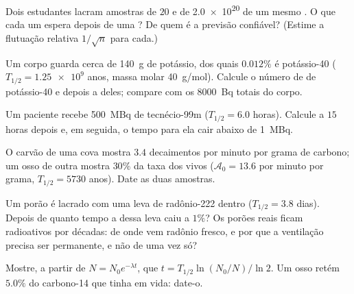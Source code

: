 \begin{exercise}[$\star\star$]\label{exo:g12:radioactive-decay:7}
Dois estudantes lacram amostras de $20$ e de \num{2.0e20}  de um mesmo .
O que cada um espera depois de uma ? De quem é a previsão confiável? (Estime a
flutuação relativa $1/\sqrt n$ para cada.)
\end{exercise}

\begin{exercise}[$\star\star$]\label{exo:g12:radioactive-decay:8}
Um corpo guarda cerca de \qty{140}{g} de potássio, dos quais $0.012\%$ é potássio-40
($T_{1/2} = \num{1.25e9}$ anos, massa molar \qty{40}{g/mol}). Calcule o número de
 de potássio-40 e depois a  deles; compare com os \qty{8000}{Bq} totais
do corpo.
\end{exercise}

\begin{exercise}[$\star\star$]\label{exo:g12:radioactive-decay:9}
Um paciente recebe \qty{500}{MBq} de tecnécio-99m ($T_{1/2} = 6.0$ horas). Calcule a
 $15$ horas depois e, em seguida, o tempo para ela cair abaixo de \qty{1}{MBq}.
\end{exercise}

\begin{exercise}[$\star\star$]\label{exo:g12:radioactive-decay:10}
O carvão de uma cova mostra $3.4$ decaimentos por minuto por grama de carbono; um osso
de outra mostra $30\%$ da taxa dos vivos ($\mathcal A_0 = 13.6$ por minuto por grama,
$T_{1/2} = \num{5730}$ anos). Date as duas amostras.
\end{exercise}

\begin{exercise}[$\star\star$]\label{exo:g12:radioactive-decay:11}
Um porão é lacrado com uma leva de radônio-222 dentro ($T_{1/2} = 3.8$ dias). Depois de
quanto tempo a  dessa leva caiu a $1\%$? Os porões reais ficam radioativos por
décadas: de onde vem radônio fresco, e por que a ventilação precisa ser permanente, e
não de uma vez só?
\end{exercise}

\begin{exercise}[$\star\star\star$]\label{exo:g12:radioactive-decay:12}
Mostre, a partir de $N = N_0 e^{-\lambda t}$, que $t = T_{1/2}\ln(N_0/N)/\ln 2$. Um osso
retém $5.0\%$ do carbono-14 que tinha em vida: date-o.
\end{exercise}

